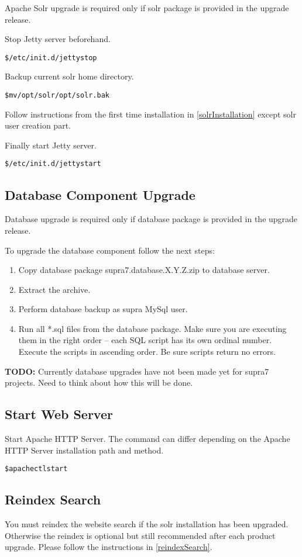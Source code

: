 \documentclass[12pt]{article}
\newcommand{\vigShowNotes}{1}
\newcommand{\vigPackageName}{supra7}
\newcommand{\todo}[1]{
\textbf{TODO:} 
#1
}
\begin{document}
Apache Solr upgrade is required only if solr package is provided in the upgrade release.

Stop Jetty server beforehand.

\begin{alltt}
\$ /etc/init.d/jetty stop
\end{alltt}

Backup current solr home directory.

\begin{alltt}
\$ mv /opt/solr /opt/solr.bak
\end{alltt}

Follow instructions from the first time installation in \ref{solrInstallation} except \textsf{solr} user creation part.

Finally start Jetty server.

\begin{alltt}
\$ /etc/init.d/jetty start
\end{alltt}

\subsection{Database Component Upgrade}

Database upgrade is required only if database package is provided in the upgrade release.

To upgrade the database component follow the next steps:

\begin{enumerate}
	\item Copy database package {\vigPackageName}.database.X.Y.Z.zip to database server.
	\item Extract the archive.
	\item Perform database backup as \textsf{supra} MySql user.
	\item Run all *.sql files from the database package. Make sure you are executing them in the right order -- each SQL script has its own ordinal number. Execute the scripts in ascending order. Be sure scripts return no errors.
\end{enumerate}

\todo{Currently database upgrades have not been made yet for supra7 projects. Need to think about how this will be done.}

\subsection{Start Web Server}
Start Apache HTTP Server. The command can differ depending on the Apache HTTP Server installation path and method.

\begin{alltt}
\$ apachectl start
\end{alltt}

\subsection{Reindex Search}

You must reindex the website search if the solr installation has been upgraded. Otherwise the reindex is optional but still recommended after each product upgrade. Please follow the instructions in \ref{reindexSearch}.
\end{document}
